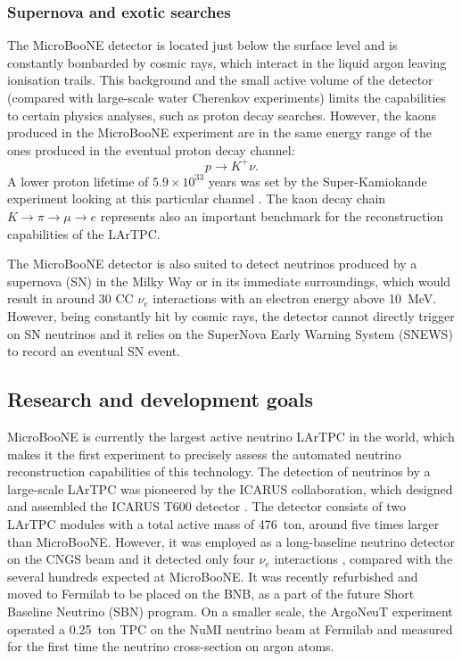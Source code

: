\subsubsection{Supernova and exotic searches}
The MicroBooNE detector is located just below the surface level and is constantly bombarded by cosmic rays, which interact in the liquid argon leaving ionisation trails. This background and the small active volume of the detector (compared with large-scale water Cherenkov experiments) limits the capabilities to certain physics analyses, such as proton decay searches. However, the kaons produced in the MicroBooNE experiment are in the same energy range of the ones produced in the eventual proton decay channel:
\begin{equation}
    p\to K^+\nu.
\end{equation}
A lower proton lifetime of $5.9\times10^{33}$ years was set by the Super-Kamiokande experiment looking at this particular channel \cite{Abe:2014mwa}. The kaon decay chain $K\rightarrow\pi\rightarrow\mu\rightarrow e$ represents also an important benchmark for the reconstruction capabilities of the LArTPC.

The MicroBooNE detector is also suited to detect neutrinos produced by a supernova (SN) in the Milky Way or in its immediate surroundings, which would result in around 30 CC $\nu_e$ interactions with an electron energy above 10~MeV. However, being constantly hit by cosmic rays, the detector cannot directly trigger on SN neutrinos and it relies on the SuperNova Early Warning System (SNEWS) to record an eventual SN event. 


\subsection{Research and development goals}
MicroBooNE is currently the largest active neutrino LArTPC in the world, which makes it the first experiment to precisely assess the automated neutrino reconstruction capabilities of this technology. The detection of neutrinos by a large-scale LArTPC was pioneered by the ICARUS collaboration, which designed and assembled the ICARUS T600 detector \cite{Amerio:2004ze}. The detector consists of two LArTPC modules with a total active mass of 476~ton, around five times larger than MicroBooNE. However, it was employed as a long-baseline neutrino detector on the CNGS beam and it detected only four $\nu_e$ interactions \cite{Antonello:2013gut}, compared with the several hundreds expected at MicroBooNE. It was recently refurbished and moved to Fermilab to be placed on the BNB, as a part of the future Short Baseline Neutrino (SBN) program. On a smaller scale, the ArgoNeuT experiment operated a 0.25~ton TPC on the NuMI neutrino beam at Fermilab \cite{Anderson:2012vc} and measured for the first time the neutrino cross-section on argon atoms.

